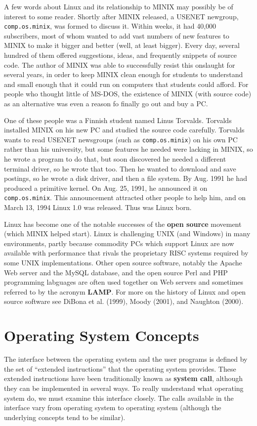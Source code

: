 \documentclass{book}
\newcommand {\kw}  [1] {\textbf{#1}}
\newcommand {\www} [1] {\texttt{#1}}
\begin{document}
A few words about Linux and its relationship to MINIX may possibly be of interest to some reader.
Shortly after MINIX released, a USENET newgroup, \www{comp.os.minix}, was formed to discuss it.
Within weeks, it had 40,000 subscribers, most of whom wanted to add vast numbers of new features to MINIX 
to make it bigger and better (well, at least bigger).
Every day, several hundred of them offered suggestions, ideas, and frequently snippets of source code.
The author of MINIX was able to successfully resist this onslaught for several years, 
in order to keep MINIX clean enough for students to understand and small enough that it could run on computers that students could afford.
For people who thought little of MS-DOS, the existence of MINIX (with source code) as an alternative was even a reason fo finally go out and buy a PC.

One of these people was a Finnish student named Linus Torvalds.
Torvalds installed MINIX on his new PC and studied the source code carefully.
Torvalds wants to read USENET newsgroups (such as \www{comp.os.minix}) on his own PC rather than his university, 
but some features he needed were lacking in MINIX, so he wrote a program to do that, but soon discovered he needed a different terminal driver,
so he wrote that too.
Then he wanted to download and save postings, so he wrote a disk driver, and then a file system.
By Aug. 1991 he had produced a primitive kernel.
On Aug. 25, 1991, he announced it on \www{comp.os.minix}.
This announcement attracted other people to help him, and on March 13, 1994 Linux 1.0 was released.
Thus was Linux born.

Linux has become one of the notable successes of the \kw{open source} movement (which MINIX helped start).
Linux is challenging UNIX (and Windows) in many environments, partly because commodity PCs which support Linux are now available with performance that rivals the proprietary RISC systems required by some UNIX implementations.
Other open source software, notably the Apache Web server and the MySQL database, 
and the open source Perl and PHP programming labguages are often used together on Web servers and sometimes referred to by the acronym \kw{LAMP}.
For more on the history of Linux and open source software see DiBona et al. (1999), Moody (2001), and Naughton (2000).

\section{Operating System Concepts}
The interface between the operating system and the user programs is defined by the set of ``extended instructions'' that the operating system provides.
These extended instructions have been traditionally known as \kw{system call}, although they can be implemented in several ways.
To really understand what operating system do, we must examine this interface closely.
The calls available in the interface vary from operating system to operating system (although the underlying concepts tend to be similar).
\end{document}
